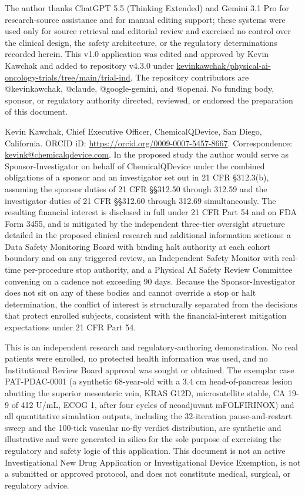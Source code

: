 The author thanks
ChatGPT 5.5 (Thinking Extended) and Gemini 3.1 Pro for research-source assistance
and for manual editing support; these systems were used only for source retrieval
and editorial review and exercised no control over the clinical design, the safety
architecture, or the regulatory determinations recorded herein. This v1.0
application was edited and approved by Kevin Kawchak and added to repository
v4.3.0 under
\href{https://github.com/kevinkawchak/physical-ai-oncology-trials/tree/main/trial-ind}{kevinkawchak/physical-ai-oncology-trials/tree/main/trial-ind}.
The repository contributors are @kevinkawchak, @claude, @google-gemini, and
@openai. No funding body, sponsor, or regulatory authority directed, reviewed, or
endorsed the preparation of this document.

Kevin Kawchak, Chief Executive Officer, ChemicalQDevice, San Diego, California.
ORCID iD:
\href{https://orcid.org/0009-0007-5457-8667}{https://orcid.org/0009-0007-5457-8667}.
Correspondence: \href{mailto:kevink@chemicalqdevice.com}{kevink@chemicalqdevice.com}.
In the proposed study the author would serve as Sponsor-Investigator on behalf of
ChemicalQDevice under the combined obligations of a sponsor and an investigator set
out in 21 CFR \S 312.3(b), assuming the sponsor duties of 21 CFR \S\S 312.50 through
312.59 and the investigator duties of 21 CFR \S\S 312.60 through 312.69
simultaneously. The resulting financial interest is disclosed in full under
21 CFR Part 54 and on FDA Form 3455, and is mitigated by the independent three-tier
oversight structure detailed in the proposed clinical research and additional
information sections: a Data Safety Monitoring Board with binding halt authority at
each cohort boundary and on any triggered review, an Independent Safety Monitor with
real-time per-procedure stop authority, and a Physical AI Safety Review Committee
convening on a cadence not exceeding 90 days. Because the Sponsor-Investigator does
not sit on any of these bodies and cannot override a stop or halt determination, the
conflict of interest is structurally separated from the decisions that protect
enrolled subjects, consistent with the financial-interest mitigation expectations
under 21 CFR Part 54.

This is an independent research and regulatory-authoring demonstration. No real
patients were enrolled, no protected health information was used, and no
Institutional Review Board approval was sought or obtained. The exemplar case
PAT-PDAC-0001 (a synthetic 68-year-old with a 3.4 cm head-of-pancreas lesion
abutting the superior mesenteric vein, KRAS G12D, microsatellite stable, CA 19-9
of 412 U/mL, ECOG 1, after four cycles of neoadjuvant mFOLFIRINOX) and all
quantitative simulation outputs, including the 32-iteration pause-and-restart sweep
and the 100-tick vascular no-fly verdict distribution, are synthetic and
illustrative and were generated in silico for the sole purpose of exercising the
regulatory and safety logic of this application. This document is not an active
Investigational New Drug Application or Investigational Device Exemption, is not a
submitted or approved protocol, and does not constitute medical, surgical, or
regulatory advice. 

